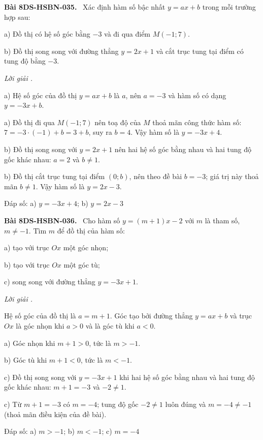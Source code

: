 \documentclass[12pt,a4paper]{article}
\newenvironment{problem}[1][]{\par\medskip\noindent\textbf{Bài #1.}\ }{\par}
\newenvironment{solution}[1][]{\par\noindent\textit{Lời giải #1.}\par}{\par}
\begin{document}
\begin{problem}[8DS-HSBN-035]
Xác định hàm số bậc nhất $y = ax + b$ trong mỗi trường hợp sau:

a) Đồ thị có hệ số góc bằng $-3$ và đi qua điểm $M(-1; 7)$.

b) Đồ thị song song với đường thẳng $y = 2x + 1$ và cắt trục tung tại điểm có tung độ bằng $-3$.

\begin{solution}
a) Hệ số góc của đồ thị $y = ax + b$ là $a$, nên $a = -3$ và hàm số có dạng $y = -3x + b$.

a) Đồ thị đi qua $M(-1; 7)$ nên toạ độ của $M$ thoả mãn công thức hàm số: $7 = -3 \cdot (-1) + b = 3 + b$, suy ra $b = 4$. Vậy hàm số là $y = -3x + 4$.

b) Đồ thị song song với $y = 2x + 1$ nên hai hệ số góc bằng nhau và hai tung độ gốc khác nhau: $a = 2$ và $b \neq 1$.

b) Đồ thị cắt trục tung tại điểm $(0; b)$, nên theo đề bài $b = -3$; giá trị này thoả mãn $b \neq 1$. Vậy hàm số là $y = 2x - 3$.

Đáp số: a) $\boxed{y = -3x + 4}$; b) $\boxed{y = 2x - 3}$
\end{solution}
\end{problem}

\begin{problem}[8DS-HSBN-036]
Cho hàm số $y = (m + 1)x - 2$ với $m$ là tham số, $m \neq -1$. Tìm $m$ để đồ thị của hàm số:

a) tạo với trục $Ox$ một góc nhọn;

b) tạo với trục $Ox$ một góc tù;

c) song song với đường thẳng $y = -3x + 1$.

\begin{solution}
Hệ số góc của đồ thị là $a = m + 1$. Góc tạo bởi đường thẳng $y = ax + b$ và trục $Ox$ là góc nhọn khi $a > 0$ và là góc tù khi $a < 0$.

a) Góc nhọn khi $m + 1 > 0$, tức là $m > -1$.

b) Góc tù khi $m + 1 < 0$, tức là $m < -1$.

c) Đồ thị song song với $y = -3x + 1$ khi hai hệ số góc bằng nhau và hai tung độ gốc khác nhau: $m + 1 = -3$ và $-2 \neq 1$.

c) Từ $m + 1 = -3$ có $m = -4$; tung độ gốc $-2 \neq 1$ luôn đúng và $m = -4 \neq -1$ (thoả mãn điều kiện của đề bài).

Đáp số: a) $\boxed{m > -1}$; b) $\boxed{m < -1}$; c) $\boxed{m = -4}$
\end{solution}
\end{problem}
\end{document}
